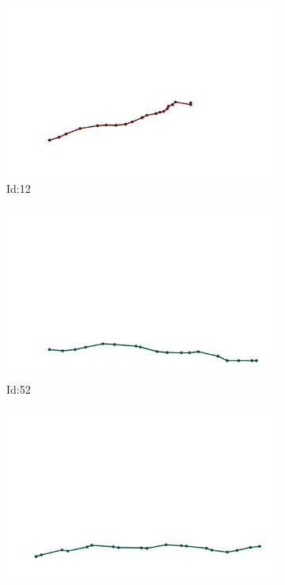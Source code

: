 \documentclass[12pt,twoside]{report}
\begin{document}
\begin{figure}
\centering
\begin{subfigure}[b]{0.20\textwidth}
\centering
\includegraphics[width=\textwidth]{../trajectories/12.png}
\caption{Id:12}
\end{subfigure}
\begin{subfigure}[b]{0.20\textwidth}
\centering
\includegraphics[width=\textwidth]{../trajectories/52.png}
\caption{Id:52}
\end{subfigure}
\begin{subfigure}[b]{0.20\textwidth}
\centering
\includegraphics[width=\textwidth]{../trajectories/94.png}

\end{subfigure}
\end{figure}
\end{document}

